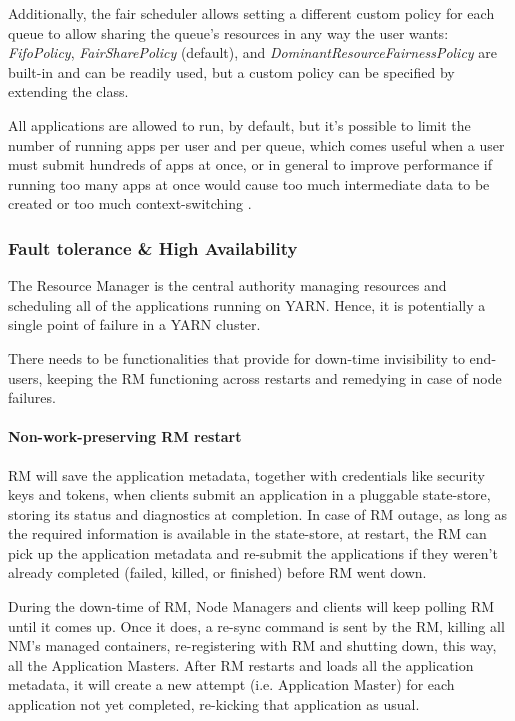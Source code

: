 Additionally, the fair scheduler allows setting a different custom policy for each queue to allow sharing the queue’s resources in any way the user wants: \textit{FifoPolicy}, \textit{FairSharePolicy} (default), and \textit{DominantResourceFairnessPolicy} are built-in and can be readily used, but a custom policy can be specified by extending the \texttt{} class. 

All applications are allowed to run, by default, but it's possible to limit the number of running apps per user and per queue, which comes useful when a user must submit hundreds of apps at once, or in general to improve performance if running too many apps at once would cause too much intermediate data to be created or too much context-switching \cite{yarn_FairSched}.

\subsubsection{Fault tolerance \& High Availability}

The Resource Manager is the central authority managing resources and scheduling all of the applications running on YARN. Hence, it is potentially a single point of failure in a YARN cluster. 

There needs to be functionalities that provide for down-time invisibility to end-users, keeping the RM functioning across restarts and remedying in case of node failures.

\paragraph{Non-work-preserving RM restart} RM will save the application metadata, together with credentials like security keys and tokens, when clients submit an application in a pluggable state-store, storing its status and diagnostics at completion. In case of RM outage, as long as the required information is available in the state-store, at restart, the RM can pick up the application metadata and re-submit the applications if they weren't already completed (failed, killed, or finished) before RM went down.

During the down-time of RM, Node Managers and clients will keep polling RM until it comes up. Once it does, a re-sync command is sent by the RM, killing all NM's managed containers, re-registering with RM and shutting down, this way, all the Application Masters. After RM restarts and loads all the application metadata, it will create a new attempt (i.e. Application Master) for each application not yet completed, re-kicking that application as usual.

